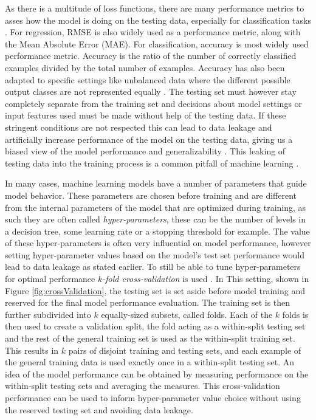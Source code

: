 \documentclass[
  11pt,
  twoside,
  BCOR=10mm,
  listof=totoc]{scrbook}
\begin{document}
As there is a multitude of loss functions, there are many performance metrics to asses how the model is doing on the testing data, especially for classification tasks \autocite{jiaoPerformanceMeasuresEvaluating2016}. For regression, RMSE is also widely used as a performance metric, along with the Mean Absolute Error (MAE). For classification, accuracy is most widely used performance metric. Accuracy is the ratio of the number of correctly classified examples divided by the total number of examples. Accuracy has also been adapted to specific settings like unbalanced data where the different possible output classes are not represented equally \autocite{brodersenBalancedAccuracyIts2010}. The testing set must however stay completely separate from the training set and decisions about model settings or input features used must be made without help of the testing data. If these stringent conditions are not respected this can lead to data leakage and artificially increase performance of the model on the testing data, giving us a biased view of the model performance and generalizability \autocite{kaufmanLeakageDataMining2011}. This leaking of testing data into the training process is a common pitfall of machine learning \autocite{whalenNavigatingPitfallsApplying2022}.

In many cases, machine learning models have a number of parameters that guide model behavior. These parameters are chosen before training and are different from the internal parameters of the model that are optimized during training, as such they are often called \emph{hyper-parameters}, these can be the number of levels in a decision tree, some learning rate or a stopping threshold for example. The value of these hyper-parameters is often very influential on model performance, however setting hyper-parameter values based on the model's test set performance would lead to data leakage as stated earlier. To still be able to tune hyper-parameters for optimal performance \(k\)\emph{-fold cross-validation} is used \autocite{hastieElementsStatisticalLearning2009}. In This setting, shown in Figure \ref{fig:crossValidation}, the testing set is set aside before model training and reserved for the final model performance evaluation. The training set is then further subdivided into \(k\) equally-sized subsets, called folds. Each of the \(k\) folds is then used to create a validation split, the fold acting as a within-split testing set and the rest of the general training set is used as the within-split training set. This results in \(k\) pairs of disjoint training and testing sets, and each example of the general training data is used exactly once in a within-split testing set. An idea of the model performance can be obtained by measuring performance on the within-split testing sets and averaging the measures. This cross-validation performance can be used to inform hyper-parameter value choice without using the reserved testing set and avoiding data leakage.
\end{document}
